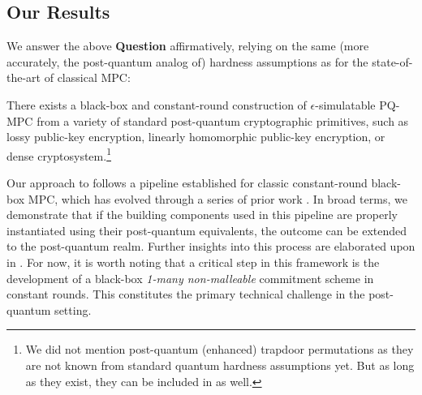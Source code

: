 



\subsection{Our Results}

We answer the above {\bf Question} affirmatively, relying on the same (more accurately, the post-quantum analog of) hardness assumptions as for the state-of-the-art of classical MPC:
\begin{theorem}\label{thm:informal:main}
There exists a black-box and constant-round construction of $\epsilon$-simulatable PQ-MPC from a variety of standard post-quantum cryptographic primitives, such as lossy public-key encryption, linearly homomorphic public-key encryption, or dense cryptosystem.\footnote{We did not mention post-quantum (enhanced) trapdoor permutations as they are not known from standard quantum hardness assumptions yet. But as long as they exist, they can be included in  as well.}
\end{theorem}

Our approach to  follows a pipeline established for classic constant-round black-box MPC, which has evolved through a series of prior work \cite{C:IshPraSah08,TCC:PasWee09,FOCS:Wee10,STOC:Goyal11,FOCS:GLOV12}. In broad terms, we demonstrate that if the building components used in this pipeline are properly instantiated using their post-quantum equivalents, the outcome can be extended to the post-quantum realm. Further insights into this process are elaborated upon in . For now, it is worth noting that a critical step in this framework is the development of a black-box {\em 1-many non-malleable} commitment scheme in constant rounds. This constitutes the primary technical challenge in the post-quantum setting.

